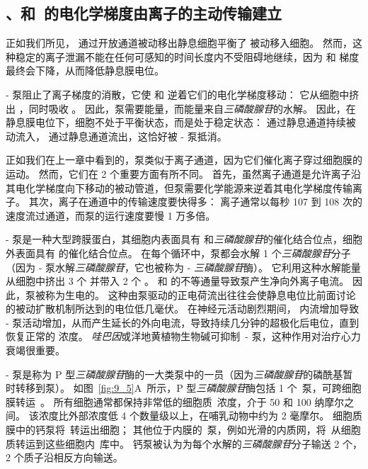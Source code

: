 \subsection{、和~的电化学梯度由离子的主动传输建立}

正如我们所见， 通过开放通道被动移出静息细胞平衡了  被动移入细胞。
然而，这种稳定的离子泄漏不能在任何可感知的时间长度内不受阻碍地继续，因为  和  梯度最终会下降，从而降低静息膜电位。


- 泵阻止了离子梯度的消散，它使  和  逆着它们的电化学梯度移动：
它从细胞中挤出 ，同时吸收 。
因此，泵需要能量，而能量来自\textit{三磷酸腺苷}的水解。
因此，在静息膜电位下，细胞不处于平衡状态，而是处于稳定状态： 通过静息通道持续被动流入， 通过静息通道流出，这恰好被 - 泵抵消。


正如我们在上一章中看到的，泵类似于离子通道，因为它们催化离子穿过细胞膜的运动。
然而，它们在 2 个重要方面有所不同。
首先，虽然离子通道是允许离子沿其电化学梯度向下移动的被动管道，但泵需要化学能源来逆着其电化学梯度传输离子。
其次，离子在通道中的传输速度要快得多：
离子通常以每秒 107 到 108 次的速度流过通道，而泵的运行速度要慢 1 万多倍。


- 泵是一种大型跨膜蛋白，其细胞内表面具有  和\textit{三磷酸腺苷}的催化结合位点，细胞外表面具有  的催化结合位点。
在每个循环中，泵都会水解 1 个\textit{三磷酸腺苷}分子（因为 - 泵水解\textit{三磷酸腺苷}，它也被称为 - \textit{三磷酸腺苷}酶）。
它利用这种水解能量从细胞中挤出 3 个  并带入 2 个 。
 和  的不等通量导致泵产生净向外离子电流。
因此，泵被称为生电的。
这种由泵驱动的正电荷流出往往会使静息电位比前面讨论的被动扩散机制所达到的电位低几毫伏。
在神经元活动剧烈期间， 内流增加导致 - 泵活动增加，从而产生延长的外向电流，导致持续几分钟的超极化后电位，直到恢复正常的  浓度。
\textit{哇巴因}或洋地黄植物生物碱可抑制~- 泵，这种作用对治疗心力衰竭很重要。


- 泵是称为 P 型\textit{三磷酸腺苷}酶的一大类泵中的一员（因为\textit{三磷酸腺苷}的磷酰基暂时转移到泵）。
如图~\ref{fig:9_5}A~所示，P 型\textit{三磷酸腺苷}酶包括 1 个~泵，可跨细胞膜转运~。
所有细胞通常都保持非常低的细胞质~浓度，介于 50 和 100 纳摩尔之间。
该浓度比外部浓度低 4 个数量级以上，在哺乳动物中约为 2 毫摩尔。
细胞质膜中的钙泵将~转运出细胞；
其他位于内膜的~泵，例如光滑的内质网，将~从细胞质转运到这些细胞内~库中。
钙泵被认为为每个水解的\textit{三磷酸腺苷}分子输送 2 个， 2 个质子沿相反方向输送。



